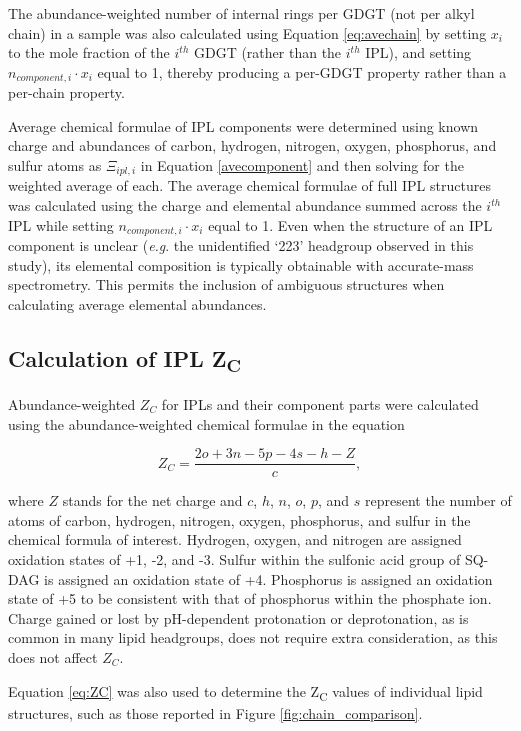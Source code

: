 The abundance-weighted number of internal rings per GDGT (not per alkyl chain) in a sample was also calculated using Equation \ref{eq:avechain} by setting $x_{i}$ to the mole fraction of the $i^{th}$ GDGT (rather than the $i^{th}$ IPL), and setting $n_{component,i} \cdot x_{i}$ equal to 1, thereby producing a per-GDGT property rather than a per-chain property.

Average chemical formulae of IPL components were determined using known charge and abundances of carbon, hydrogen, nitrogen, oxygen, phosphorus, and sulfur atoms as $\Xi_{ipl,i}$ in Equation \ref{avecomponent} and then solving for the weighted average of each. The average chemical formulae of full IPL structures was calculated using the charge and elemental abundance summed across the $i^{th}$ IPL while setting $n_{component,i} \cdot x_{i}$ equal to 1. Even when the structure of an IPL component is unclear (\textit{e.g}. the unidentified `223' headgroup observed in this study), its elemental composition is typically obtainable with accurate-mass spectrometry. This permits the inclusion of ambiguous structures when calculating average elemental abundances.

\subsection{Calculation of IPL Z\textsubscript{C}}
Abundance-weighted $Z_{C}$ for IPLs and their component parts were calculated using the abundance-weighted chemical formulae in the equation

\begin{equation} \label{eq:ZC}
{Z}_{C} = \frac{2o + 3n - 5p - 4s - h - Z}{c},
\end{equation}

\noindent where $Z$ stands for the net charge and $c$, $h$, $n$, $o$, $p$, and $s$ represent the number of atoms of carbon, hydrogen, nitrogen, oxygen, phosphorus, and sulfur in the chemical formula of interest. Hydrogen, oxygen, and nitrogen are assigned oxidation states of +1, -2, and -3. Sulfur within the sulfonic acid group of SQ-DAG is assigned an oxidation state of +4. Phosphorus is assigned an oxidation state of +5 to be consistent with that of phosphorus within the phosphate ion. Charge gained or lost by pH-dependent protonation or deprotonation, as is common in many lipid headgroups, does not require extra consideration, as this does not affect $Z_{C}$.

Equation \ref{eq:ZC} was also used to determine the Z\textsubscript{C} values of individual lipid structures, such as those reported in Figure \ref{fig:chain_comparison}.

